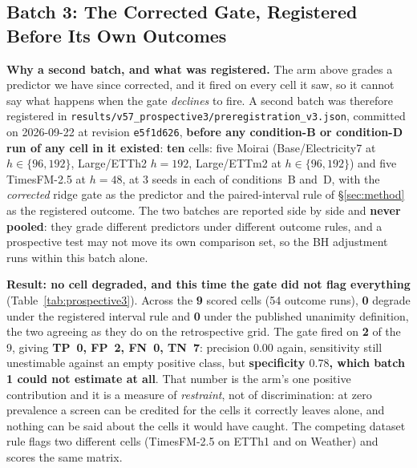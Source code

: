 \subsection{Batch 3: The Corrected Gate, Registered Before Its Own Outcomes}
\label{app:prospective3}

\textbf{Why a second batch, and what was registered.}  The arm above grades a
predictor we have since corrected, and it fired on every cell it saw, so it
cannot say what happens when the gate \emph{declines} to fire.  A second batch was
therefore registered in
\texttt{results/v57\_prospective3/preregistration\_v3.json}, committed on
2026-09-22 at revision \texttt{e5f1d626}, \textbf{before any condition-B or
condition-D run of any cell in it existed}: \textbf{ten} cells: five Moirai
(Base/Electricity7 at $h{\in}\{96,192\}$, Large/ETTh2 $h{=}192$, Large/ETTm2 at
$h{\in}\{96,192\}$) and five TimesFM-2.5 at $h{=}48$, at 3 seeds in each of
conditions~B and~D, with the \emph{corrected} ridge gate as the predictor and the
paired-interval rule of \S\ref{sec:method} as the registered outcome.  The two
batches are reported side by side and \textbf{never pooled}: they grade different
predictors under different outcome rules, and a prospective test may not move its
own comparison set, so the BH adjustment runs within this batch alone.

\textbf{Result: no cell degraded, and this time the gate did not flag everything}
(Table~\ref{tab:prospective3}).  Across the \textbf{9} scored cells (54 outcome
runs), \textbf{0} degrade under the registered interval rule and \textbf{0} under
the published unanimity definition, the two agreeing as they do on the
retrospective grid.  The gate fired on \textbf{2} of the 9, giving \textbf{TP~0,
FP~2, FN~0, TN~7}: precision $0.00$ again, sensitivity still unestimable against
an empty positive class, but \textbf{specificity $0.78$, which batch 1 could not
estimate at all}.  That number is the arm's one positive contribution and it is a
measure of \emph{restraint}, not of discrimination: at zero prevalence a screen
can be credited for the cells it correctly leaves alone, and nothing can be said
about the cells it would have caught.  The competing dataset rule flags two
different cells (TimesFM-2.5 on ETTh1 and on Weather) and scores the same matrix.


